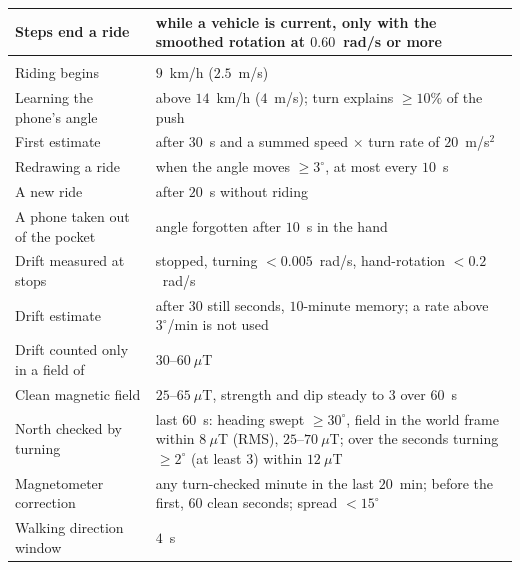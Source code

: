 \begin{tabular}{>{\raggedright\arraybackslash}p{}>{\raggedright\arraybackslash}p{}}
Steps end a ride & while a vehicle is current, only with the smoothed rotation at $0.60$~rad/s or more\\
\midrule
\multicolumn{2}{l}{\emph{Direction}}\\
Riding begins & $9$~km/h ($2.5$~m/s)\\
Learning the phone's angle & above $14$~km/h ($4$~m/s); turn explains $\geq 10\%$ of the push\\
First estimate & after $30$~s and a summed speed $\times$ turn rate of $20$~m/s$^2$\\
Redrawing a ride & when the angle moves $\geq 3^\circ$, at most every $10$~s\\
A new ride & after $20$~s without riding\\
A phone taken out of the pocket & angle forgotten after $10$~s in the hand\\
Drift measured at stops & stopped, turning $< 0.005$~rad/s, hand-rotation $< 0.2$~rad/s\\
Drift estimate & after $30$ still seconds, $10$-minute memory; a rate above $3^\circ$/min is not used\\
Drift counted only in a field of & $30$--$60~\mu$T\\
Clean magnetic field & $25$--$65~\mu$T, strength and dip steady to $3$ over $60$~s\\
North checked by turning & last $60$~s: heading swept $\geq 30^\circ$, field in the world frame within $8~\mu$T (RMS), $25$--$70~\mu$T; over the seconds turning $\geq 2^\circ$ (at least $3$) within $12~\mu$T\\
Magnetometer correction & any turn-checked minute in the last $20$~min; before the first, $60$ clean seconds; spread $< 15^\circ$\\
Walking direction window & $4$~s\\
\bottomrule
\end{tabular}
